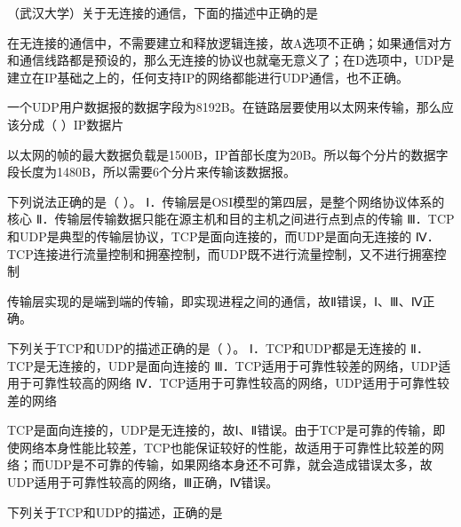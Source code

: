 \question （武汉大学）关于无连接的通信，下面的描述中正确的是
\par{}
\begin{solution}在无连接的通信中，不需要建立和释放逻辑连接，故A选项不正确；如果通信对方和通信线路都是预设的，那么无连接的协议也就毫无意义了；在D选项中，UDP是建立在IP基础之上的，任何支持IP的网络都能进行UDP通信，也不正确。
\end{solution}
\question 一个UDP用户数据报的数据字段为8192B。在链路层要使用以太网来传输，那么应该分成（
）IP数据片
\par{}
\begin{solution}以太网的帧的最大数据负载是1500B，IP首部长度为20B。所以每个分片的数据字段长度为1480B，所以需要6个分片来传输该数据报。
\end{solution}
\question 下列说法正确的是（ ）。
Ⅰ．传输层是OSI模型的第四层，是整个网络协议体系的核心
Ⅱ．传输层传输数据只能在源主机和目的主机之间进行点到点的传输
Ⅲ．TCP和UDP是典型的传输层协议，TCP是面向连接的，而UDP是面向无连接的
Ⅳ．TCP连接进行流量控制和拥塞控制，而UDP既不进行流量控制，又不进行拥塞控制
\par{}
\begin{solution}传输层实现的是端到端的传输，即实现进程之间的通信，故Ⅱ错误，Ⅰ、Ⅲ、Ⅳ正确。
\end{solution}
\question 下列关于TCP和UDP的描述正确的是（ ）。 Ⅰ．TCP和UDP都是无连接的
Ⅱ．TCP是无连接的，UDP是面向连接的
Ⅲ．TCP适用于可靠性较差的网络，UDP适用于可靠性较高的网络
Ⅳ．TCP适用于可靠性较高的网络，UDP适用于可靠性较差的网络
\par{}
\begin{solution}TCP是面向连接的，UDP是无连接的，故Ⅰ、Ⅱ错误。由于TCP是可靠的传输，即使网络本身性能比较差，TCP也能保证较好的性能，故适用于可靠性比较差的网络；而UDP是不可靠的传输，如果网络本身还不可靠，就会造成错误太多，故UDP适用于可靠性较高的网络，Ⅲ正确，Ⅳ错误。
\end{solution}
\question 下列关于TCP和UDP的描述，正确的是
\par{}
